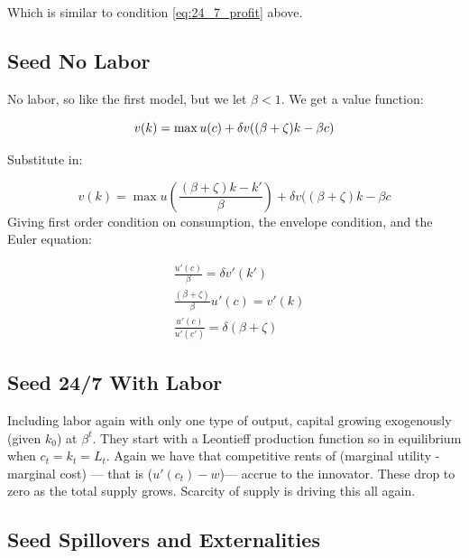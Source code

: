 \documentclass[11pt]{article}
\begin{document}
  Which is similar to condition \ref{eq:24_7_profit} above.
  
  
\subsection{Seed No Labor}
\label{sub:seed_no_labor}
  
  No labor, so like the first model, but we let $\beta < 1$. We get a value function:

  \begin{equation} \label{eq:no_labor_vf}
    v(k) = \max u(c) + \delta v((\beta + \zeta)k - \beta c)\\
  \end{equation}
  
  Substitute in:

  \begin{equation}
      v(k) = \max u(\frac{(\beta + \zeta)k - k'}{\beta}) + \delta v((\beta + \zeta)k - \beta c  
  \end{equation}  
  Giving first order condition on consumption, the envelope condition, and the Euler equation:

  \begin{align}
    &\frac{u'(c)}{\beta} = \delta v'(k') \label{no_labor_foc}\\
    &\frac{(\beta + \zeta)}{\beta} u'(c) = v'(k) \label{no_labor_ec} \\
    &\frac{u'(c)}{u'(c')} = \delta(\beta + \zeta) \label{no_labor_ee}
  \end{align}

\subsection{Seed 24/7 With Labor}
\label{sub:seed_24_7_with_labor}

  Including labor again with only one type of output, capital growing exogenously (given $k_0$) at $\beta^t$.  They start with a Leontieff production function so in equilibrium when $c_t = k_t = L_t$.  Again we have that competitive rents of (marginal utility - marginal cost) --- that is ($u'(c_t) - w$)--- accrue to the innovator.  These drop to zero as the total supply grows.  Scarcity of supply is driving this all again.

\subsection{Seed Spillovers and Externalities}
\label{sub:seed_spillovers_and_externalities}
\end{document}

